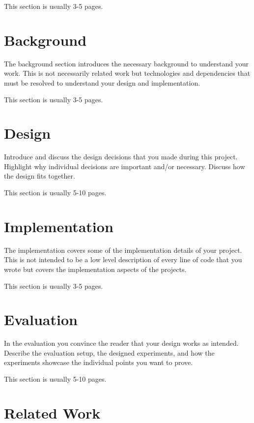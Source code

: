 \documentclass[a4paper,12pt,oneside]{report}
\begin{document}
This section is usually 3-5 pages.

\chapter{Background}

The background section introduces the necessary background to understand your
work. This is not necessarily related work but technologies and dependencies
that must be resolved to understand your design and implementation.

This section is usually 3-5 pages.


\chapter{Design}

Introduce and discuss the design decisions that you made during this project.
Highlight why individual decisions are important and/or necessary. Discuss
how the design fits together.

This section is usually 5-10 pages.


\chapter{Implementation}

The implementation covers some of the implementation details of your project.
This is not intended to be a low level description of every line of code that
you wrote but covers the implementation aspects of the projects.

This section is usually 3-5 pages.


\chapter{Evaluation}

In the evaluation you convince the reader that your design works as intended.
Describe the evaluation setup, the designed experiments, and how the
experiments showcase the individual points you want to prove.

This section is usually 5-10 pages.


\chapter{Related Work}
\end{document}
